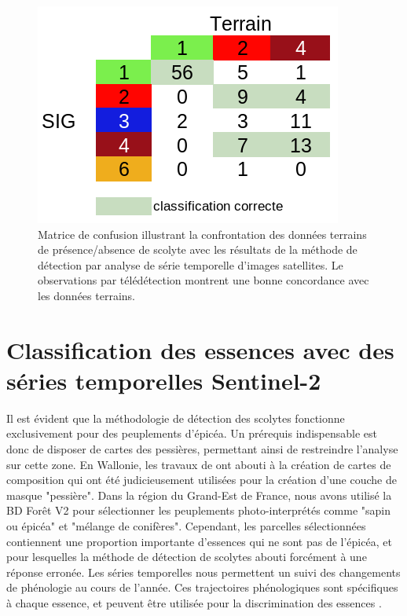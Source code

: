 \documentclass[a4paper, 12pt]{article} %
\begin{document}
\begin{figure}
	\centering
	\includegraphics[width=\linewidth]{confusionMat.png}
	\caption{Matrice de confusion illustrant la confrontation des données terrains de présence/absence de scolyte avec les résultats de la méthode de détection par analyse de série temporelle d'images satellites. Le observations par télédétection montrent une bonne concordance avec les données terrains.}
	\label{fig:tabConMat}
\end{figure}

\section{Classification des essences avec des séries temporelles Sentinel-2}

Il est évident que la méthodologie de détection des scolytes fonctionne exclusivement pour des peuplements d'épicéa. 
Un prérequis indispensable est donc de disposer de cartes des pessières, permettant ainsi de restreindre l'analyse sur cette zone. 
En Wallonie, les travaux de \citep{bolyn_forest_2018} ont abouti à la création de cartes de composition qui ont été judicieusement utilisées pour la création d'une couche de masque "pessière".
Dans la région du Grand-Est de France, nous avons utilisé la BD Forêt V2 pour sélectionner les peuplements photo-interprétés comme "sapin ou épicéa" et "mélange de conifères".
Cependant, les parcelles sélectionnées contiennent une proportion importante d'essences qui ne sont pas de l'épicéa, et pour lesquelles la méthode de détection de scolytes abouti forcément à une réponse erronée. 
Les séries temporelles nous permettent un suivi des changements de phénologie au cours de l'année.
Ces trajectoires phénologiques sont spécifiques à chaque essence, et peuvent être utilisée pour la discrimination des essences \citep{grabska_forest_2019,ma_tree_2021}.
\end{document}
